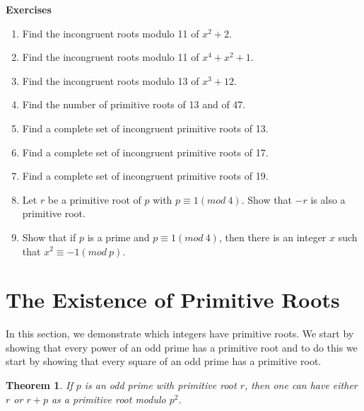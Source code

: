 \documentclass[12pt,letterpaper]{book}
\newtheorem{theorem}{Theorem}
\begin{document}
\textbf{Exercises}
\begin{enumerate}
\item{Find the incongruent roots modulo 11 of $x^2+2$.}\item{Find
the incongruent roots modulo 11 of $x^4+x^2+1$.}\item{Find the
incongruent roots modulo 13 of $x^3+12$.}\item{Find the number of
primitive roots of 13 and of 47.}\item{Find a complete set of
incongruent primitive roots of 13.}\item{Find a complete set of
incongruent primitive roots of 17.}\item{Find a complete set of
incongruent primitive roots of 19.}\item{Let $r$ be a primitive root
of $p$ with $p\equiv 1(mod \ 4)$.  Show that $-r$ is also a
primitive root.}\item{Show that if $p$ is a prime and $p\equiv 1(mod
\ 4)$, then there is an integer $x$ such that $x^2\equiv -1(mod \
p)$.}
\end{enumerate}

\newpage

\section{The Existence of Primitive Roots}
In this section, we demonstrate which integers have primitive roots.
We start by showing that every power of an odd prime has a primitive
root and to do this we start by showing that every square of an odd
prime has a primitive root.

\begin{theorem}
If $p$ is an odd prime with primitive root $r$, then one can have
either $r$ or $r+p$ as a primitive root modulo $p^2$.
\end{theorem}
\end{document}

